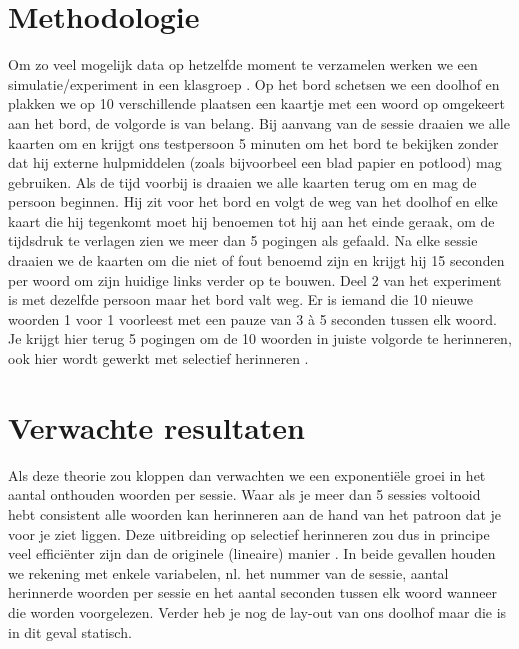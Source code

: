 \documentclass{voorstel}
\begin{document}
	
	\section{Methodologie}
	\label{sec:methodologie}
	
	Om zo veel mogelijk data op hetzelfde moment te verzamelen werken we een simulatie/experiment in een klasgroep \autocite{RoedigerKarpicke2006}. Op het bord schetsen we een doolhof en plakken we op 10 verschillende plaatsen een kaartje met een woord op omgekeert aan het bord, de volgorde is van belang. Bij aanvang van de sessie draaien we alle kaarten om en krijgt ons testpersoon 5 minuten om het bord te bekijken zonder dat hij externe hulpmiddelen (zoals bijvoorbeel een blad papier en potlood) mag gebruiken. Als de tijd voorbij is draaien we alle kaarten terug om en mag de persoon beginnen. Hij zit voor het bord en volgt de weg van het doolhof en elke kaart die hij tegenkomt moet hij benoemen tot hij aan het einde geraak, om de tijdsdruk te verlagen zien we meer dan 5 pogingen als gefaald. Na elke sessie draaien we de kaarten om die niet of fout benoemd zijn en krijgt hij 15 seconden per woord om zijn huidige links verder op te bouwen. Deel 2 van het experiment is met dezelfde persoon maar het bord valt weg. Er is iemand die 10 nieuwe woorden 1 voor 1 voorleest met een pauze van 3 à 5 seconden tussen elk woord. Je krijgt hier terug 5 pogingen om de 10 woorden in juiste volgorde te herinneren, ook hier wordt gewerkt met selectief herinneren \autocite{BuschkeFuld1974}.
	
	\section{Verwachte resultaten}
	\label{sec:verwachte_resultaten}
	
	Als deze theorie zou kloppen dan verwachten we een exponentiële groei in het aantal onthouden woorden per sessie. Waar als je meer dan 5 sessies voltooid hebt consistent alle woorden kan herinneren aan de hand van
	het patroon dat je voor je ziet liggen. Deze uitbreiding op selectief herinneren zou dus in principe veel efficiënter zijn dan de originele (lineaire) manier \autocite{BuschkeFuld1974}. In beide gevallen houden we
	rekening met enkele variabelen, nl. het nummer van de sessie, aantal herinnerde woorden per sessie en het aantal seconden tussen elk woord wanneer die worden voorgelezen. Verder heb je nog de lay-out van ons
	doolhof maar die is in dit geval statisch.
	
\end{document}
